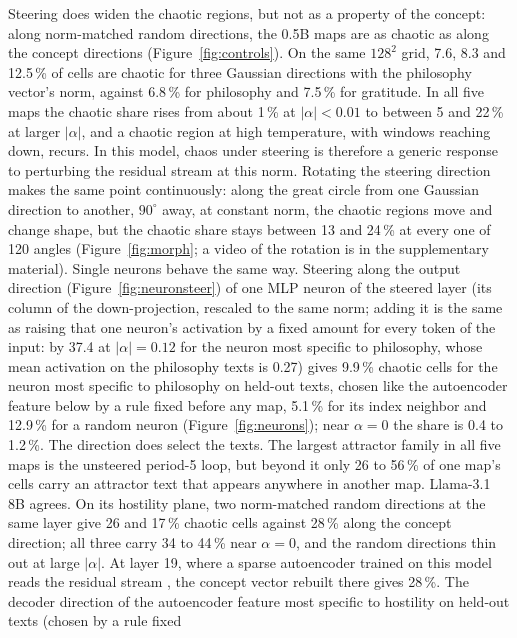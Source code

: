 \documentclass[11pt,letterpaper]{article}
\begin{document}
Steering does widen the chaotic regions, but not as a property of the concept: along norm-matched random directions,
the 0.5B maps are as chaotic as along the concept directions (Figure~\ref{fig:controls}). On the same $128^2$ grid,
7.6, 8.3 and 12.5\,\% of cells are chaotic for three Gaussian directions with the philosophy vector's norm, against
6.8\,\% for philosophy and 7.5\,\% for gratitude. In all five maps the chaotic share rises from about 1\,\% at
$|\alpha|<0.01$ to between 5 and 22\,\% at larger $|\alpha|$, and a chaotic region at high temperature, with windows
reaching down, recurs. In this model, chaos under steering is therefore a generic response to perturbing the residual
stream at this norm. Rotating the steering direction makes the same point continuously: along the great circle from
one Gaussian direction to another, $90^{\circ}$ away, at constant norm, the chaotic regions move and change shape, but
the chaotic share stays between 13 and 24\,\% at every one of 120 angles (Figure~\ref{fig:morph}; a video of the
rotation is in the supplementary material). Single neurons behave the same way. Steering along the output direction (Figure~\ref{fig:neuronsteer})
of one MLP neuron of the steered layer (its column of the down-projection, rescaled to the same norm; adding it is the same as raising that one neuron's activation by a fixed amount for every token of the input: by 37.4 at $|\alpha|=0.12$ for the neuron most specific to philosophy, whose mean activation on the philosophy texts is 0.27) gives 9.9\,\%
chaotic cells for the neuron most specific to philosophy on held-out texts, chosen like the autoencoder feature below
by a rule fixed before any map, 5.1\,\% for its index neighbor and 12.9\,\% for a random neuron
(Figure~\ref{fig:neurons}); near $\alpha=0$ the share is 0.4 to 1.2\,\%. The direction does select the texts. The largest attractor family in all five maps is the
unsteered period-5 loop, but beyond it only 26 to 56\,\% of one map's cells carry an attractor text that appears
anywhere in another map. Llama-3.1 8B agrees. On its hostility plane, two norm-matched random directions at the same
layer give 26 and 17\,\% chaotic cells against 28\,\% along the concept direction; all three carry 34 to 44\,\% near
$\alpha=0$, and the random directions thin out at large $|\alpha|$. At layer 19, where a sparse autoencoder trained on
this model reads the residual stream \cite{goodfire2025sae}, the concept vector rebuilt there gives 28\,\%. The
decoder direction of the autoencoder feature most specific to hostility on held-out texts (chosen by a rule fixed
\end{document}
